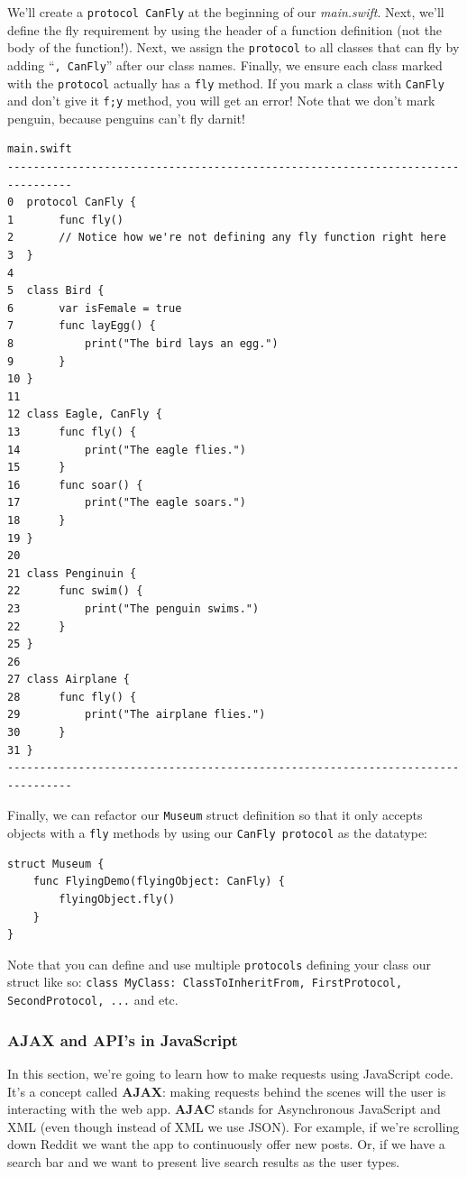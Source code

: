 \documentclass[11pt, letterpaper]{article}
\begin{document}
We'll create a \verb+protocol CanFly+ at the beginning of our \emph{main.swift}. Next, we'll define the fly requirement by using
the header of a function definition (not the body of the function!). Next, we assign the \verb+protocol+ to all classes
that can fly by adding ``\verb+, CanFly+'' after our class names. Finally, we ensure each class marked with the 
\verb+protocol+ actually has a \verb+fly+ method. If you mark a class with \verb+CanFly+ and don't give it \verb+f;y+
method, you will get an error! Note that we don't mark penguin, because penguins can't fly darnit! \\

\begin{verbatim}
main.swift
--------------------------------------------------------------------------------
0  protocol CanFly {
1       func fly()
2       // Notice how we're not defining any fly function right here
3  }
4
5  class Bird {
6       var isFemale = true
7       func layEgg() {
8           print("The bird lays an egg.")
9       }
10 }
11 
12 class Eagle, CanFly {
13      func fly() {
14          print("The eagle flies.")
15      }
16      func soar() {
17          print("The eagle soars.")
18      }
19 }
20
21 class Penginuin {
22      func swim() {
23          print("The penguin swims.")
22      }
25 }
26
27 class Airplane {
28      func fly() {
29          print("The airplane flies.")
30      }
31 }
--------------------------------------------------------------------------------
\end{verbatim}

Finally, we can refactor our \verb+Museum+ struct definition so that it only accepts objects with a \verb+fly+ methods
by using our \verb+CanFly protocol+ as the datatype:

\begin{verbatim}
struct Museum {
    func FlyingDemo(flyingObject: CanFly) {
        flyingObject.fly()
    }
}
\end{verbatim}

Note that you can define and use multiple \verb+protocols+ defining your class our struct like so:
\verb+class MyClass: ClassToInheritFrom, FirstProtocol, SecondProtocol, ...+ and etc.

\subsubsection*{AJAX and API's in JavaScript}

In this section, we're going to learn how to make requests using JavaScript code. It's a concept called \textbf{AJAX}:
making requests behind the scenes will the user is interacting with the web app. \textbf{AJAC} stands for Asynchronous
JavaScript and XML (even though instead of XML we use JSON).
For example, if we're scrolling down 
Reddit we want the app to continuously offer new posts. Or, if we have a search bar and we want to present live
search results as the user types. \\
\end{document}
